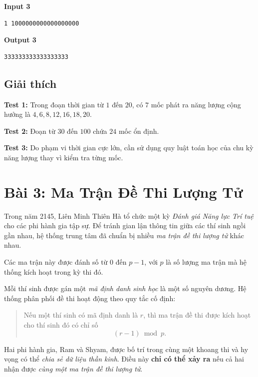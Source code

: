 \vspace{1em}

\noindent
\begin{minipage}[t]{0.48\textwidth}
\textbf{Input 3}
\begin{verbatim}
1 1000000000000000000
\end{verbatim}
\end{minipage}
\hfill
\begin{minipage}[t]{0.48\textwidth}
\textbf{Output 3}
\begin{verbatim}
333333333333333333
\end{verbatim}
\end{minipage}

\subsection*{Giải thích}

\textbf{Test 1:} Trong đoạn thời gian từ $1$ đến $20$, có $7$ mốc phát ra năng lượng cộng hưởng là $4,6,8,12,16,18,20$.

\textbf{Test 2:} Đoạn từ $30$ đến $100$ chứa $24$ mốc ổn định.

\textbf{Test 3:} Do phạm vi thời gian cực lớn, cần sử dụng quy luật toán học của chu kỳ năng lượng thay vì kiểm tra từng mốc.

\bigskip

\section*{Bài 3: Ma Trận Đề Thi Lượng Tử}

Trong năm 2145, Liên Minh Thiên Hà tổ chức một kỳ \emph{Đánh giá Năng lực Trí tuệ} cho các phi hành gia tập sự.
Để tránh gian lận thông tin giữa các thí sinh ngồi gần nhau, hệ thống trung tâm đã chuẩn bị nhiều \emph{ma trận đề thi lượng tử} khác nhau.

Các ma trận này được đánh số từ $0$ đến $p-1$, với $p$ là số lượng ma trận mà hệ thống kích hoạt trong kỳ thi đó.

Mỗi thí sinh được gán một \emph{mã định danh sinh học} là một số nguyên dương.  
Hệ thống phân phối đề thi hoạt động theo quy tắc cố định:

\begin{quote}
    Nếu một thí sinh có mã định danh là $r$, thì ma trận đề thi được kích hoạt cho thí sinh đó có chỉ số
    \[
        (r - 1) \bmod p.
    \]
\end{quote}

Hai phi hành gia, Ram và Shyam, được bố trí trong cùng một khoang thi và hy vọng có thể \emph{chia sẻ dữ liệu thần kinh}.  
Điều này \textbf{chỉ có thể xảy ra} nếu cả hai nhận được \emph{cùng một ma trận đề thi lượng tử}.

